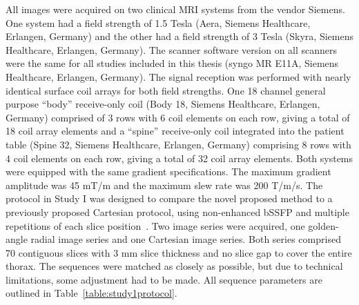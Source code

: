 All images were acquired on two clinical MRI systems from the vendor Siemens. One system had a field strength of 1.5 Tesla (Aera, Siemens Healthcare, Erlangen, Germany) and the other had a field strength of 3 Tesla (Skyra, Siemens Healthcare, Erlangen, Germany). The scanner software version on all scanners were the same for all studies included in this thesis (syngo MR E11A, Siemens Healthcare, Erlangen, Germany). The signal reception was performed with nearly identical surface coil arrays for both field strengths. One 18 channel general purpose ``body'' receive-only coil (Body 18, Siemens Healthcare, Erlangen, Germany) comprised of 3 rows with 6 coil elements on each row, giving a total of 18 coil array elements and a ``spine'' receive-only coil integrated into the patient table (Spine 32, Siemens Healthcare, Erlangen, Germany) comprising 8 rows with 4 coil elements on each row, giving a total of 32 coil array elements. Both systems were equipped with the same gradient specifications. The maximum gradient amplitude was 45 mT/m and the maximum slew rate was 200 T/m/s.
The protocol in Study I was designed to compare the novel proposed method to a previously proposed Cartesian protocol, using non-enhanced bSSFP and multiple repetitions of each slice position~\cite{Nyren2017}. Two image series were acquired, one golden-angle radial image series and one Cartesian image series. Both series comprised 70 contiguous slices with 3 mm slice thickness and no slice gap to cover the entire thorax. The sequences were matched as closely as possible, but due to technical limitations, some adjustment had to be made. All sequence parameters are outlined in Table~\ref{table:study1protocol}.
